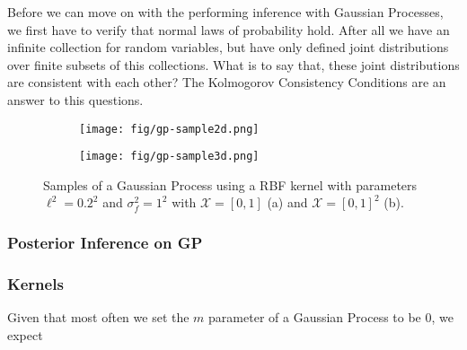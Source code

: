 Before we can move on with the performing inference with Gaussian Processes, we first have to verify that normal laws of probability hold.
After all we have an infinite collection for random variables, but have only defined joint distributions over finite subsets of this collections.
What is to say that, these joint distributions are consistent with each other?
The Kolmogorov Consistency Conditions are an answer to this questions.


\begin{figure}
     \centering
     \begin{subfigure}[b]{0.45\textwidth}
         \centering
         \texttt{[image: fig/gp-sample2d.png]}
         \caption{}
         \label{subfig:2d-gp-sample}
     \end{subfigure}
     \hfill
     \begin{subfigure}[b]{0.45\textwidth}
         \centering
         \texttt{[image: fig/gp-sample3d.png]}
         \caption{}
         \label{subfig:3d-gp-sample}
     \end{subfigure}
     \hfill
    \caption{Samples of a Gaussian Process using a RBF kernel with parameters $\ell^{2} = 0.2^2$ and $\sigma^{2}_f = 1 ^ 2$ with
        $\mathcal{X} = [0, 1]$ (a) and $\mathcal{X} = [0, 1]^2$ (b).
    }
    \label{fig:gp-sample}
\end{figure}

\subsubsection{Posterior Inference on GP}

\subsubsection{Kernels}

Given that most often we set the $m$ parameter of a Gaussian Process to be 0,
we expect 


